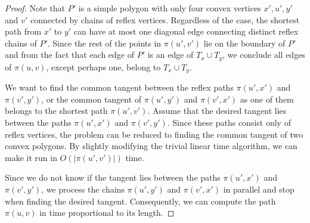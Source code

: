 \documentclass[a4paper,UKenglish]{lipics}
\newcommand{\p}[2]{\ensuremath{\pi(#1, #2)}}
\begin{document}
\begin{proof}
Note that $P'$ is a simple polygon with only four convex vertices $x',u', y'$ and $v'$ connected by chains of reflex vertices. 
Regardless of the case, the shortest path from $x'$ to $y'$ can have at most one diagonal edge connecting distinct reflex chains of $P'$. Since the rest of the points in $\p{u'}{v'}$ lie on the boundary of $P'$ and from the fact that each edge of $P'$ is an edge of $T_x\cup T_y$, we conclude all edges of $\p{u}{v}$, except perhaps one, belong to $T_x\cup T_y$.

We want to find the common tangent between the reflex paths $\p{u'}{x'}$ and $\p{v'}{y'}$, or the common tangent of $\p{u'}{y'}$ and $\p{v'}{x'}$ as one of them belongs to the shortest path $\p{u'}{v'}$.
Assume that the desired tangent lies between the paths $\p{u'}{x'}$ and $\p{v'}{y'}$. 
Since these paths consist only of reflex vertices, the problem can be reduced to finding the common tangent of two convex polygons. By slightly modifying the trivial linear time algorithm, we can make it run in $O(|\p{u'}{v'}|)$ time. 

Since we do not know if the tangent lies between the paths $\p{u'}{x'}$ and $\p{v'}{y'}$, we process the chains $\p{u'}{y'}$ and $\p{v'}{x'}$ in parallel and stop when finding the desired tangent. Consequently, we can compute the path $\p{u}{v}$ in time proportional to its length. 
\end{proof}
\end{document}
